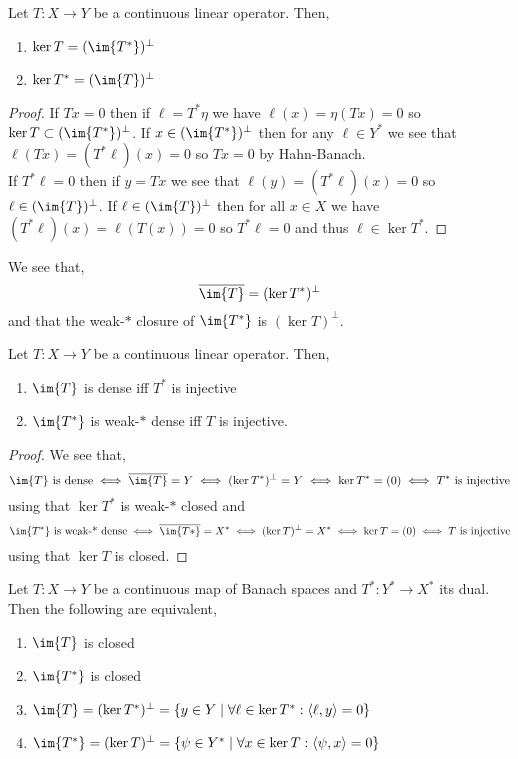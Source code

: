 \documentclass[12pt]{article}
\newcommand{\inner}[2]{\left< #1, #2 \right>}
\begin{document}
\begin{prop}
Let $T : X \to Y$ be a continuous linear operator. Then,
\begin{enumerate}
\item $\ker{T} = (\im{T^*})^\perp$
\item $\ker{T^*} = (\im{T})^\perp$
\end{enumerate}
\end{prop}

\begin{proof}
If $T x = 0$ then if $\ell = T^* \eta$ we have $\ell(x) = \eta(T x) = 0$ so $\ker{T} \subset (\im{T^*})^\perp$. If $x \in (\im{T^*})^\perp$ then for any $\ell \in Y^*$ we see that $\ell(T x) = (T^* \ell)(x) = 0$ so $T x = 0$ by Hahn-Banach. 
\bigskip\\
If $T^* \ell = 0$ then if $y = T x$ we see that $\ell(y) = (T^* \ell)(x) = 0$ so $\ell \in (\im{T})^\perp$. If $\ell \in (\im{T})^\perp$ then for all $x \in X$ we have $(T^* \ell)(x) = \ell(T(x)) = 0$ so $T^* \ell = 0$ and thus $\ell \in \ker{T^*}$.
\end{proof}

\begin{cor}
We see that,
\[ \overline{\im{T}} = (\ker{T^*})^\perp \]
and that the weak-$*$ closure of $\im{T^*}$ is $(\ker{T})^\perp$. 
\end{cor}

\begin{cor}
Let $T : X \to Y$ be a continuous linear operator. Then,
\begin{enumerate}
\item $\im{T}$ is dense iff $T^*$ is injective
\item $\im{T^*}$ is weak-$*$ dense iff $T$ is injective.
\end{enumerate}
\end{cor}

\begin{proof}
We see that,
\[ \im{T} \text{ is dense} \iff \overline{\im{T}} = Y \iff (\ker{T^*})^\perp = Y \iff \ker{T^*} = (0) \iff T^* \text{ is injective} \]
using that $\ker{T^*}$ is weak-$*$ closed and
\[ \im{T^*} \text{ is weak-* dense} \iff \overline{\im{T*}} = X^* \iff (\ker{T})^\perp = X^* \iff \ker{T} = (0) \iff T \text{ is injective} \]
using that $\ker{T}$ is closed.
\end{proof}

\begin{thm}
Let $T : X \to Y$ be a continuous map of Banach spaces and $T^* : Y^* \to X^*$ its dual. Then the following are equivalent,
\begin{enumerate}
\item $\im{T}$ is closed
\item $\im{T^*}$ is closed
\item $\im{T} = (\ker{T^*})^\perp = \{ y \in Y \mid \forall \ell \in \ker{T^*} : \inner{\ell}{y} = 0 \}$
\item $\im{T^*} = (\ker{T})^\perp = \{ \psi \in Y^* \mid \forall x \in \ker{T} : \inner{\psi}{x} = 0 \}$
\end{enumerate}
\end{thm}
\end{document}
